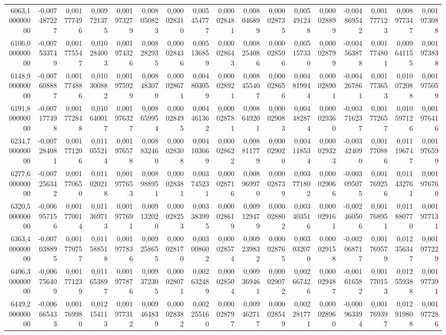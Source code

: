 \begin{longtable}{rrrrrrrrrrrrrrrrr}
6063,100000000 & -0,007487227 & 0,001777496 & 0,009721375 & 0,001973279 & 0,008050823 & 0,000028310 & 0,005454777 & 0,000028481 & 0,008046899 & 0,000028735 & 0,005491248 & 0,000028899 & -0,004869542 & 0,001777123 & 0,008977347 & 0,001973088\\
6106,000000000 & -0,007533749 & 0,001775547 & 0,010284003 & 0,001974326 & 0,008282935 & 0,000028436 & 0,005136859 & 0,000028643 & 0,008254086 & 0,000028596 & 0,005157330 & 0,000028799 & -0,004563878 & 0,001774801 & 0,009641155 & 0,001973838\\
6148,900000000 & -0,007608887 & 0,001774886 & 0,010300882 & 0,001975929 & 0,008483079 & 0,000028671 & 0,004803059 & 0,000028921 & 0,008455407 & 0,000028656 & 0,004819944 & 0,000028901 & -0,004267861 & 0,001773653 & 0,010072088 & 0,001975059\\
6191,800000000 & -0,007177498 & 0,001772848 & 0,010640017 & 0,001976327 & 0,008659954 & 0,000028495 & 0,004461362 & 0,000028781 & 0,008649201 & 0,000029083 & 0,004482874 & 0,000029360 & -0,003716237 & 0,001772657 & 0,010597126 & 0,001976416\\
6234,700000000 & -0,007284081 & 0,001771206 & 0,011055214 & 0,001976578 & 0,008832460 & 0,000028308 & 0,004103669 & 0,000028622 & 0,008811779 & 0,000029020 & 0,004118534 & 0,000029323 & -0,003424090 & 0,001770886 & 0,011196747 & 0,001976599\\
6277,600000000 & -0,007256342 & 0,001770650 & 0,011020218 & 0,001977653 & 0,008988951 & 0,000028381 & 0,003745231 & 0,000028716 & 0,008969970 & 0,000028739 & 0,003771802 & 0,000029066 & -0,003095075 & 0,001769256 & 0,011432761 & 0,001976760\\
6320,500000000 & -0,006957156 & 0,001770014 & 0,011369713 & 0,001977691 & 0,009132020 & 0,000028253 & 0,003383995 & 0,000028619 & 0,009129479 & 0,000028802 & 0,003403516 & 0,000029161 & -0,002460506 & 0,001768951 & 0,011880770 & 0,001977131\\
6363,400000000 & -0,007038895 & 0,001770757 & 0,011588518 & 0,001977836 & 0,009258655 & 0,000028170 & 0,003008602 & 0,000028574 & 0,009239832 & 0,000028765 & 0,003032070 & 0,000029158 & -0,002068717 & 0,001769579 & 0,012356347 & 0,001977229\\
6406,300000000 & -0,006756409 & 0,001771239 & 0,011653897 & 0,001977876 & 0,009372305 & 0,000028071 & 0,002632489 & 0,000028504 & 0,009369461 & 0,000029072 & 0,002667426 & 0,000029487 & -0,001616582 & 0,001770153 & 0,012559388 & 0,001977391\\
6449,200000000 & -0,006665433 & 0,001769980 & 0,012154113 & 0,001977312 & 0,009464839 & 0,000028382 & 0,002255160 & 0,000028797 & 0,009462717 & 0,000028549 & 0,002281771 & 0,000028960 & -0,000963394 & 0,001769397 & 0,012919808 & 0,001977286\\

\end{longtable}
